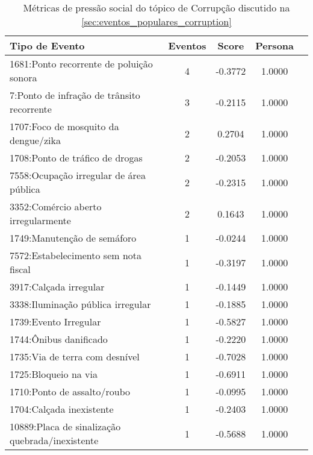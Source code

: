 \begin{table}[htbp]
	\centering
	\caption{Métricas de pressão social do tópico de Corrupção discutido na \autoref{sec:eventos_populares_corruption}}
	\label{tab:eventos_populares_corruption}
	\begin{tabular}{|l|c|c|c|c|}
		\hline
		\textbf{Tipo de Evento}                         & \textbf{Eventos} & \textbf{Score} & \textbf{Persona} \\
		\hline
		1681:Ponto recorrente de poluição sonora        & 4                & -0.3772        & 1.0000           \\
		\hline
		7:Ponto de infração de trânsito recorrente      & 3                & -0.2115        & 1.0000           \\
		\hline
		1707:Foco de mosquito da dengue/zika            & 2                & 0.2704         & 1.0000           \\
		\hline
		1708:Ponto de tráfico de drogas                 & 2                & -0.2053        & 1.0000           \\
		\hline
		7558:Ocupação irregular de área pública         & 2                & -0.2315        & 1.0000           \\
		\hline
		3352:Comércio aberto irregularmente             & 2                & 0.1643         & 1.0000           \\
		\hline
		1749:Manutenção de semáforo                     & 1                & -0.0244        & 1.0000           \\
		\hline
		7572:Estabelecimento sem nota fiscal            & 1                & -0.3197        & 1.0000           \\
		\hline
		3917:Calçada irregular                          & 1                & -0.1449        & 1.0000           \\
		\hline
		3338:Iluminação pública irregular               & 1                & -0.1885        & 1.0000           \\
		\hline
		1739:Evento Irregular                           & 1                & -0.5827        & 1.0000           \\
		\hline
		1744:Ônibus danificado                          & 1                & -0.2220        & 1.0000           \\
		\hline
		1735:Via de terra com desnível                  & 1                & -0.7028        & 1.0000           \\
		\hline
		1725:Bloqueio na via                            & 1                & -0.6911        & 1.0000           \\
		\hline
		1710:Ponto de assalto/roubo                     & 1                & -0.0995        & 1.0000           \\
		\hline
		1704:Calçada inexistente                        & 1                & -0.2403        & 1.0000           \\
		\hline
		10889:Placa de sinalização quebrada/inexistente & 1                & -0.5688        & 1.0000           \\
		\hline
	\end{tabular}
\end{table}

